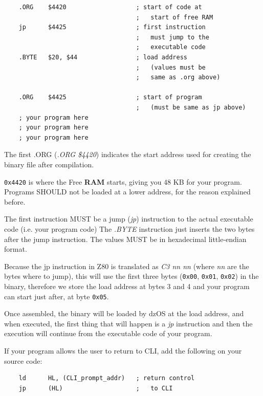 \documentclass[a4paper,11pt]{article}
\begin{document}
    \begin{lstlisting}
    .ORG    $4420                   ; start of code at
                                    ;   start of free RAM
    jp      $4425                   ; first instruction
                                    ;   must jump to the
                                    ;   executable code
    .BYTE   $20, $44                ; load address
                                    ;   (values must be
                                    ;   same as .org above)

    .ORG    $4425                   ; start of program
                                    ;   (must be same as jp above)
    ; your program here
    ; your program here
    ; your program here
    \end{lstlisting}

    The first .ORG (\textit{.ORG \$4420}) indicates the start address used for
    creating the binary file after compilation.

    \texttt{0x4420} is where the Free \textbf{RAM} starts, giving you 48 KB for
    your program. Programs SHOULD not be loaded at a lower address, for the 
    reason explained before.

    The first instruction MUST be a jump (\textit{jp}) instruction to the actual
    executable code (i.e. your program code) The \textit{.BYTE} instruction just
    inserts the two bytes after the jump instruction. The values MUST be in
    hexadecimal little-endian format.

    Because the jp instruction in Z80 is translated as \textit{C3 nn nn} (where
    \textit{nn} are the bytes where to jump), this will use the first three
    bytes (\texttt{0x00}, \texttt{0x01}, \texttt{0x02}) in the binary, therefore
    we store the load address at bytes 3 and 4 and your program can start just
    after, at byte \texttt{0x05}.

    Once assembled, the binary will be loaded by dzOS at the load address, and
    when executed, the first thing that will happen is a \textit{jp} instruction
    and then the execution will continue from the executable code of your
    program.

    If your program allows the user to return to CLI, add the following on your
    source code:

    \begin{lstlisting}
    ld      HL, (CLI_prompt_addr)   ; return control
    jp      (HL)                    ;   to CLI
    \end{lstlisting}
\end{document}
